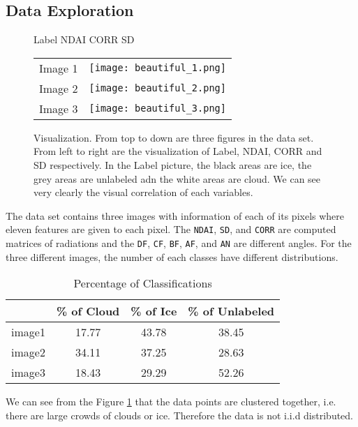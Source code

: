 \documentclass[letterpaper,11pt]{article}
\begin{document}
\subsection{Data Exploration}

\begin{figure}[!hbt]
    \centering
    \hspace{35pt} Label \hspace{70pt} NDAI \hspace{75pt}  CORR \hspace{80pt} SD
    \begin{tabular}{c|c} 
    Image 1 & \texttt{[image: beautiful\_1.png]} \\
    Image 2 & \texttt{[image: beautiful\_2.png]} \\
    Image 3 & \texttt{[image: beautiful\_3.png]}
    \end{tabular}
    \caption{Visualization. From top to down are three figures in the data set. From left to right are the visualization of Label, NDAI, CORR and SD respectively. In the Label picture, the black areas are ice, the grey areas are unlabeled adn the white areas are cloud. We can see very clearly the visual correlation of each variables.}
    \label{fig:beautiful}
\end{figure}

The data set contains three images with information of each of its pixels where eleven features are given to each pixel. The \verb|NDAI|, \verb|SD|, and \verb|CORR| are computed matrices of radiations and the \verb|DF|, \verb|CF|, \verb|BF|, \verb|AF|, and \verb|AN| are different angles. For the three different images, the number of each classes have different distributions.

\begin{table}[!hbt]
    \centering
    \begin{tabular}{|c|c|c|c|}\hline
         & \% of Cloud & \% of Ice & \% of Unlabeled \\ \hline
         image1 & 17.77 & 43.78 & 38.45 \\ \hline
         image2 & 34.11 & 37.25 & 28.63 \\ \hline
         image3 & 18.43 & 29.29 & 52.26 \\ \hline
    \end{tabular}
    \caption{Percentage of Classifications}
    \label{tab:class}
\end{table}


We can see from the Figure \ref{fig:beautiful} that the data points are clustered together, i.e. there are large crowds of clouds or ice. Therefore the data is not i.i.d distributed.
\end{document}
